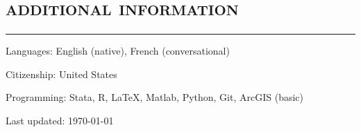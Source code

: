 \documentclass[letterpaper]{article}
\def\footerlink{}
\renewenvironment{itemize}{
  \begin{list}{}{
    \setlength{\leftmargin}{1em}
      \setlength{\itemsep}{0.25em}
    \setlength{\parskip}{0pt}
    \setlength{\parsep}{0pt} 
  }
}{
  \end{list}
}
\begin{document}
\section*{\textsc{\textbf{additional information}}}
\hrule
\vspace{.2cm}


\begin{itemize}
    \item Languages: English (native), French (conversational)
    \item Citizenship: United States
    \item Programming: Stata, R, \LaTeX, Matlab, Python, Git, ArcGIS (basic)
\end{itemize}









\bigskip

\begin{center}
  \begin{footnotesize}
    Last updated: 
\today
{} \\
  \end{footnotesize}
\end{center}
\end{document}

